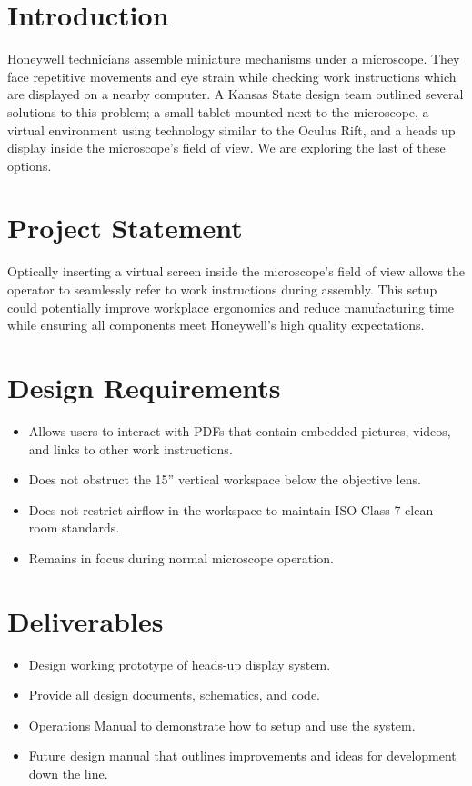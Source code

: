 \documentclass[12pt,a4paper]{article}
\begin{document}
\section{Introduction}
Honeywell technicians assemble miniature mechanisms under a microscope. They face repetitive movements and eye strain while checking work instructions which are displayed on a nearby computer. A Kansas State design team outlined several solutions to this problem; a small tablet mounted next to the microscope, a virtual environment using technology similar to the Oculus Rift, and a heads up display inside the microscope’s field of view. We are exploring the last of these options. 



\section{Project Statement}
Optically inserting a virtual screen inside the microscope’s field of view allows the operator to seamlessly refer to work instructions during assembly. This setup could potentially improve workplace ergonomics and reduce manufacturing time while ensuring all components meet Honeywell’s high quality expectations. 

\section{Design Requirements}

\begin{itemize}
	\item Allows users to interact with PDFs that contain embedded pictures, videos, and links to other work instructions.
	\item Does not obstruct the 15” vertical workspace below the objective lens.
	\item Does not restrict airflow in the workspace to maintain ISO Class 7 clean room standards.
	\item Remains in focus during normal microscope operation.
\end{itemize}

\section{Deliverables}
\begin{itemize}
	\item Design working prototype of heads-up display system.
	\item Provide all design documents, schematics, and code.
	\item Operations Manual to demonstrate how to setup and use the system.
	\item Future design manual that outlines improvements and ideas for development down the line.
\end{itemize}
\end{document}

